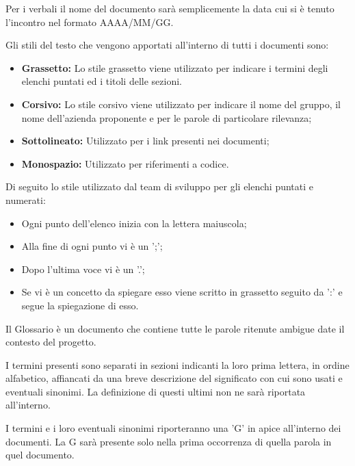     Per i verbali il nome del documento sarà semplicemente la data cui si è tenuto l'incontro nel formato AAAA/MM/GG.

    
    Gli stili del testo che vengono apportati all’interno di tutti i documenti sono:

    \begin{itemize}
      \item \textbf{Grassetto:} Lo stile grassetto viene utilizzato per indicare i termini degli elenchi puntati ed i titoli delle sezioni.
      \item \textbf{Corsivo:} Lo stile corsivo viene utilizzato per indicare il nome del gruppo, il nome dell'azienda proponente e per le parole di particolare rilevanza;
      \item \textbf{Sottolineato:} Utilizzato per i link presenti nei documenti;
      \item \textbf{Monospazio:} Utilizzato per riferimenti a codice.
    \end{itemize}


    Di seguito lo stile utilizzato dal team di sviluppo per gli elenchi puntati e numerati:
    \begin{itemize}
      \item Ogni punto dell'elenco inizia con la lettera maiuscola;
      \item Alla fine di ogni punto vi è un ';';
      \item Dopo l'ultima voce vi è un '.';
      \item Se vi è un concetto da spiegare esso viene scritto in grassetto seguito da ':' e segue la spiegazione di esso. %
    \end{itemize}

    Il Glossario è un documento che contiene tutte le parole ritenute ambigue date il contesto del progetto.

    I termini presenti sono separati in sezioni indicanti la loro prima lettera, in ordine alfabetico, affiancati
    da una breve descrizione del significato con cui sono usati e eventuali sinonimi.
    La definizione di questi ultimi non ne sarà riportata all'interno.

    I termini e i loro eventuali sinonimi riporteranno una 'G' in apice all'interno dei documenti. La G sarà
    presente solo nella prima occorrenza di quella parola in quel documento.

